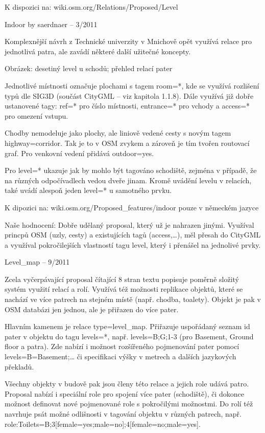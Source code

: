 K dispozici na: wiki.osm.org/Relations/Proposed/Level 

Indoor by saerdnaer – 3/2011



Komplexnější návrh z Technické univerzity v Mnichově opět využívá relace pro jednotlivá patra, ale zavádí některé další užitečné koncepty.



Obrázek: desetiný level u schodů; přehled relací pater

Jednotlivé místnosti označuje plochami s tagem room=*, kde se využívá rozlišení typů dle SIG3D (součást CityGML – viz kapitola 1.1.8). Dále využívá již dobře ustanovené tagy: ref=* pro číslo místnosti, entrance=* pro vchody a access=* pro omezení vstupu.

Chodby nemodeluje jako plochy, ale liniově vedené cesty s novým tagem highway=corridor. Tak je to v OSM zvykem a zároveň je tím tvořen routovací graf. Pro venkovní vedení přidává outdoor=yes.

Pro level=* ukazuje jak by mohlo být tagováno schodiště, zejména v případě, že na různých odpočívadlech vedou dveře jinam. Kromě uvádění levelu v relacích, také uvádí alespoň jeden level=* u samotného prvku.

K dipozici na: wiki.osm.org/Proposed\_features/indoor pouze v německém jazyce

Naše hodnocení: Dobře udělaný proposal, který už je nahrazen jinými. Využíval princpů OSM (uzly, cesty) a existujících tagů (access,…), měl přesah do CityGML a využíval pokročilejších vlastností tagu level, který i přenášel na jednolivé prvky.

Level\_map – 9/2011



Zcela vyčerpávající proposal čítající 8 stran textu popisuje poměrně složitý systém využití relací a rolí. Využívá též možnosti replikace objektů, které se nachází ve více patrech na stejném místě (např. chodba, toalety). Objekt je pak v OSM databázi jen jednou, ale je přiřazen do více pater.

Hlavním kamenem je relace type=level\_map. Přiřazuje uspořádaný seznam id pater v objektu do tagu levels=*, např. levels=B;G;1-3 (pro Basement, Ground floor a patra). Zde nabízí i možnost rozšířeného pojmenování pater pomocí levels=B=Basement;… či specifikaci výšky v metrech a dalších jazykových překladů.

Všechny objekty v budově pak jsou členy této relace a jejich role udává patro. Proposal nabízí i speciální role pro spojení více pater (schodiště), či dokonce možnost definovat nové pojmenované role s pokročilými možnostmi. Do rolí též navrhuje psát možné odlišnosti v tagování objektu v různých patrech, např. role:Toilets=B;3[female=yes;male=no];4[female=no;male=yes].

